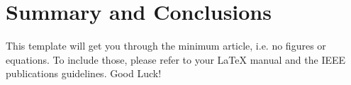 \section{Summary and Conclusions}
This template will get you through the minimum article, 
i.e. no figures or equations.  To include those, please 
refer to your LaTeX manual and the IEEE publications 
guidelines.  Good Luck!

